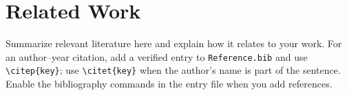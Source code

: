\section{Related Work}
\label{sec:related-work}

Summarize relevant literature here and explain how it relates to your work. For an author--year citation, add a verified entry to \texttt{Reference.bib} and use \verb|\citep{key}|; use \verb|\citet{key}| when the author's name is part of the sentence. Enable the bibliography commands in the entry file when you add references.
